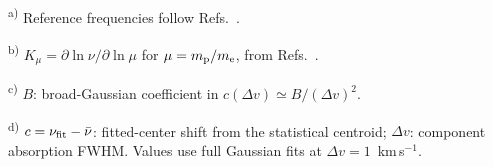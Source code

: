 \begin{table}[!htbp]
\begin{minipage}{\linewidth}
\footnotesize\raggedright
\textsuperscript{a)} Reference frequencies follow Refs.~.\par
\textsuperscript{b)} $K_\mu=\partial\ln\nu/\partial\ln\mu$ for
$\mu=m_{\rm p}/m_{\rm e}$, from
Refs.~.\par
\textsuperscript{c)} $B$: broad-Gaussian coefficient in $c(\Delta v)\simeq B/(\Delta v)^2$.\par
\textsuperscript{d)} $c=\nu_{\rm fit}-\bar\nu$: fitted-center shift from the statistical centroid; $\Delta v$: component absorption FWHM. Values use full Gaussian fits at $\Delta v=1$~km\,s$^{-1}$.\par
\end{minipage}
\end{table}
